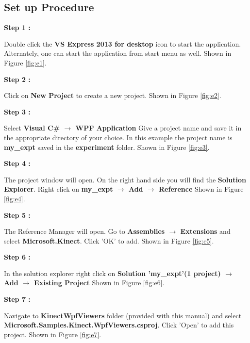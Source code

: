 \begin{flushleft}
\begin{itemize}
\medskip
\end{itemize}
\subsection{\textbf{ Set up Procedure}}

\textbf{Step 1 :}
\medskip

Double click the \textbf{VS Express 2013 for desktop} icon to start the application.
Alternately, one can start the application from start menu as well.
Shown in Figure \ref{fig:e1}.
\medskip

\textbf{Step 2 :}

\medskip
Click on \textbf{New Project} to create a new project.
Shown in Figure \ref{fig:e2}.

\medskip

\textbf{Step 3 :}

\medskip
Select 
\textbf{Visual C\# $\rightarrow$ WPF Application}
Give a project name and save it in the appropriate directory of your choice. In this example the project name is \textbf{my\_expt} saved in the \textbf{experiment} folder.
Shown in Figure \ref{fig:e3}.

\medskip

\textbf{Step 4 :}

\medskip

The project window will open. On the right hand side you will find the \textbf{Solution Explorer}.
Right click on \textbf{my\_expt $\rightarrow$ Add $\rightarrow$ Reference}
Shown in Figure \ref{fig:e4}.

\medskip

\textbf{Step 5 :}

\medskip

The Reference Manager will open. Go to \textbf{Assemblies $\rightarrow$ Extensions} and select \textbf{Microsoft.Kinect}. Click 'OK' to add.
Shown in Figure \ref{fig:e5}.
 
\medskip

\textbf{Step 6 :}

\medskip

In the solution explorer right click on \textbf{Solution 'my\_expt'(1 project) $\rightarrow$ Add $\rightarrow$ Existing Project}
Shown in Figure \ref{fig:e6}.

\medskip

\textbf{Step 7 :}

\medskip

Navigate to \textbf{KinectWpfViewers} folder (provided with this manual) and select \textbf{Microsoft.Samples.Kinect.WpfViewers.csproj}. Click 'Open' to add this project.
Shown in Figure \ref{fig:e7}.


\end{flushleft}
